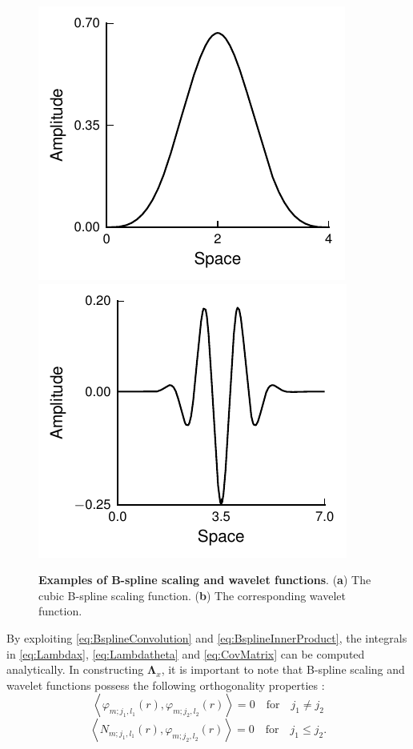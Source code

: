\documentclass[11pt,draftcls,onecolumn,peerreview]{IEEEtran}
\begin{document}
\begin{figure}[!ht]
\centering
\includegraphics{./Graph/Figure1a.pdf}
\includegraphics{./Graph/Figure1b.pdf}
\caption{{\bf Examples of B-spline  scaling and wavelet functions}. (\textbf{a}) The cubic B-spline scaling function. (\textbf{b}) The corresponding wavelet function.}
\label{fig:MRA-Figure1}
\end{figure}

By exploiting \eqref{eq:BsplineConvolution} and \eqref{eq:BsplineInnerProduct}, the integrals in \eqref{eq:Lambdax}, \eqref{eq:Lambdatheta} and \eqref{eq:CovMatrix} can be computed analytically. In constructing $\boldsymbol\Lambda_{x}$, it is important to note that B-spline scaling and wavelet functions possess the following orthogonality properties \cite{Unser1993}: 
\begin{equation}
  \left\langle \varphi_{m;j_1,l_1}(r),\varphi_{m;j_2,l_2}(r)\right\rangle =0  \quad \mathrm{for} \quad j_1\neq j_2
 \label{eq:MRA-PsiPsiOrthogonality} 
 \end{equation}
 \begin{equation}
  \left\langle N_{m;j_1,l_1}(r),\varphi_{m;j_2,l_2}(r)\right\rangle =0  \quad \mathrm{for} \quad j_1\leq j_2.
 \label{eq:MRA-PhiPsiOrthogonality}
 \end{equation}
\end{document}
